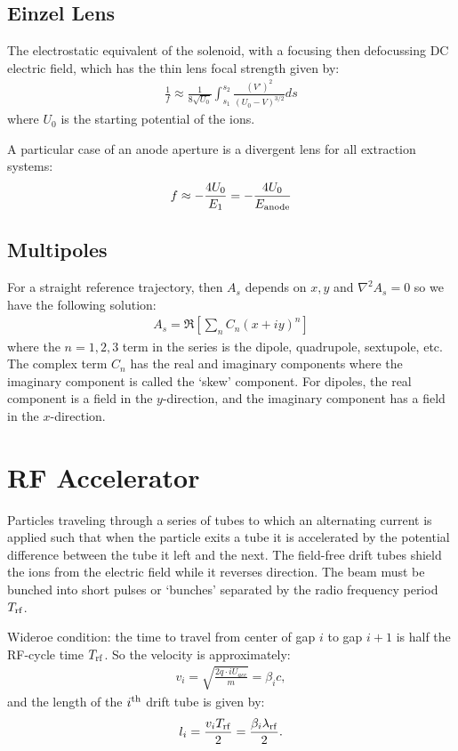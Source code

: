\documentclass{article}
\numberwithin{equation}{section}
\begin{document}
\subsection{Einzel Lens}
The electrostatic equivalent of the solenoid, with a focusing then defocussing DC electric field, which has the thin lens focal strength given by:
\begin{align}
\frac{1}{f} \approx \frac{1}{8\sqrt{U_0}} \int_{s_1}^{s_2} \frac{(V')^2}{(U_0-V)^{3/2}}ds
\end{align}
where $U_0$ is the starting potential of the ions. 

A particular case of an anode aperture is a divergent lens for all extraction systems:
\begin{align}
f \approx -\frac{4U_0}{E_1} = - \frac{4U_0}{E_{\rm anode}}
\end{align}

\subsection{ Multipoles }
For a straight reference trajectory, then $A_s$ depends on $x,y$ and $\nabla^2 A_s = 0$ so we have the following solution:
\begin{align}
A_s = \Re \left[ \sum_n C_n (x + iy)^n \right]
\end{align}
where the $n = 1,2,3$ term in the series is the dipole, quadrupole, sextupole, etc. The complex term $C_n$ has the real and imaginary components where the imaginary component is called the `skew' component. For dipoles, the real component is a field in the $y$-direction, and the imaginary component has a field in the $x$-direction.


\section{RF Accelerator}

Particles traveling through a series of tubes to which an alternating current is applied such that when the particle exits a tube it is accelerated by the potential difference between the tube it left and the next. The field-free drift tubes shield the ions from the electric field while it reverses direction. The beam must be bunched into short pulses or `bunches' separated by the radio frequency period $T_{\rm rf}$. 

Wideroe condition: the time to travel from center of gap $i$ to gap $i+1$ is half the RF-cycle time  $T_{\rm rf}$. So the velocity is approximately:
\begin{align}
v_i = \sqrt{ \frac{2 q \cdot i U_{acc}}{m} } = \beta_i c,
\end{align}
and the length of the $i^{\rm th}$ drift tube is given by:
\begin{align}
l_i = \frac{v_i T_{\rm rf}}{2} = \frac{\beta_i \lambda_{\rm rf}}{2}.
\end{align}
\end{document}
